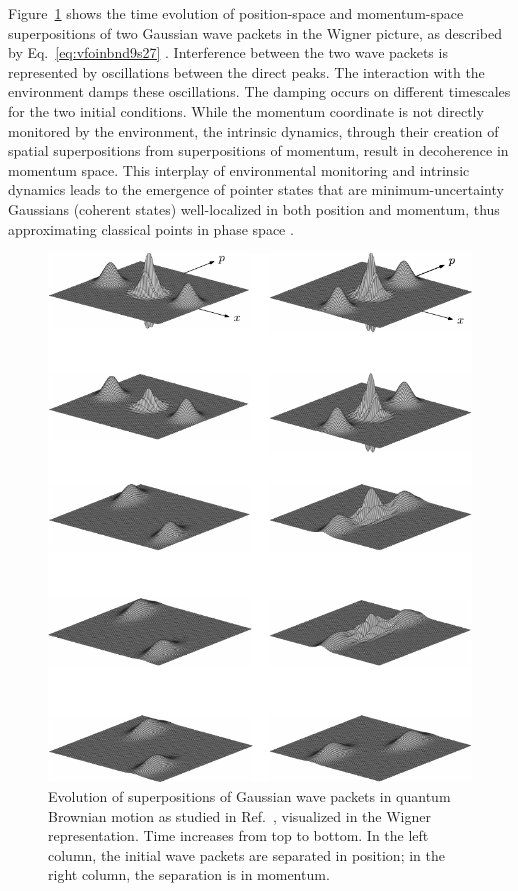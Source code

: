 \documentclass[aps,pra,reprint,amsmath,amssymb,showpacs,nofootinbib,floatfix,onecolumn,12pt]{revtex4-1}
\begin{document}
Figure~\ref{fig:gaussmov} shows the time evolution of position-space and momentum-space superpositions of two Gaussian wave
packets in the Wigner picture, as described by Eq.~\eqref{eq:vfoinbnd9s27} \cite{Paz:1993:ta}. Interference between the two wave packets is represented by oscillations between the direct peaks. The interaction with the environment damps these oscillations. The damping occurs on different timescales for the two initial conditions. While the momentum coordinate is not directly monitored by the environment, the intrinsic dynamics, through their creation of spatial superpositions from superpositions of momentum, result in decoherence in momentum space. This interplay of environmental monitoring and intrinsic dynamics leads to the emergence of pointer states that are minimum-uncertainty Gaussians (coherent states) well-localized in both position and momentum, thus approximating classical points in phase space \cite{Kubler:1973:ux,Paz:1993:ta,Zurek:1993:pu,Zurek:2002:ii,Diosi:2000:yn,Joos:2003:jh,Eisert:2003:ib}.

\begin{figure}
\centering
\vspace{.6cm}
\includegraphics[scale=0.7]{psdec.pdf}
\vspace{.6cm}
\caption{Evolution of superpositions of Gaussian wave
  packets in quantum Brownian motion as studied in Ref.~\cite{Paz:1993:ta}, visualized in the Wigner representation. Time increases from top to bottom. In the left column, the initial wave packets are separated in position; in the right column, the separation is in momentum. }
\label{fig:gaussmov}
\end{figure}
\end{document}
